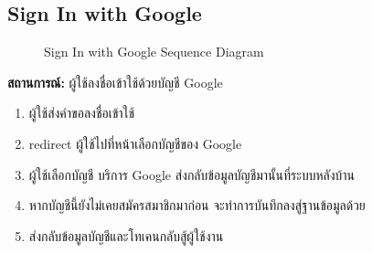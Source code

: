 \subsection{Sign In with Google}
\begin{figure}[H]\centering
    \setlength{\fboxrule}{0.2mm} %
    \caption{Sign In with Google Sequence Diagram}\label{fig:signinSeqDiagram}
\end{figure}
\textbf{สถานการณ์: }ผู้ใช้ลงชื่อเข้าใช้ด้วยบัญชี Google
\begin{enumerate}
    \item ผู้ใช้ส่งคำขอลงชื่อเข้าใช้
    \item redirect ผู้ใช้ไปที่หน้าเลือกบัญชีของ Google
    \item ผู้ใช้เลือกบัญชี บริการ Google ส่งกลับข้อมูลบัญชีมานั้นที่ระบบหลังบ้าน
    \item หากบัญชีนี้ยังไม่เคยสมัครสมาชิกมาก่อน จะทำการบันทึกลงสู่ฐานข้อมูลด้วย
    \item ส่งกลับข้อมูลบัญชีและโทเคนกลับสู้ผู้ใช้งาน
\end{enumerate}

